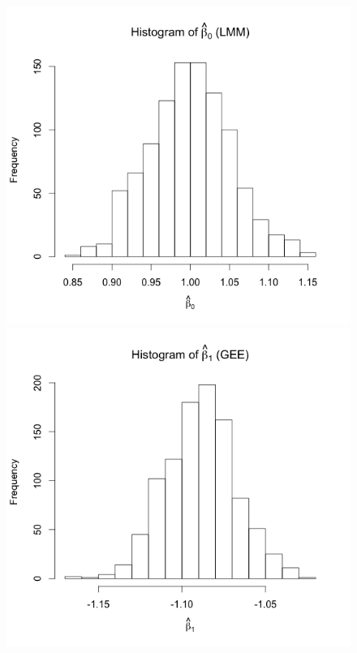 \documentclass[11pt]{article}
\begin{document}
\begin{enumerate}
\begin{enumerate}
\begin{figure}[H]
				\includegraphics[scale=0.4]{Rplot4b0LMM}
				\includegraphics[scale=0.4]{Rplot4b1GEE}

\end{figure}
\end{enumerate}
\end{enumerate}
\end{document}
